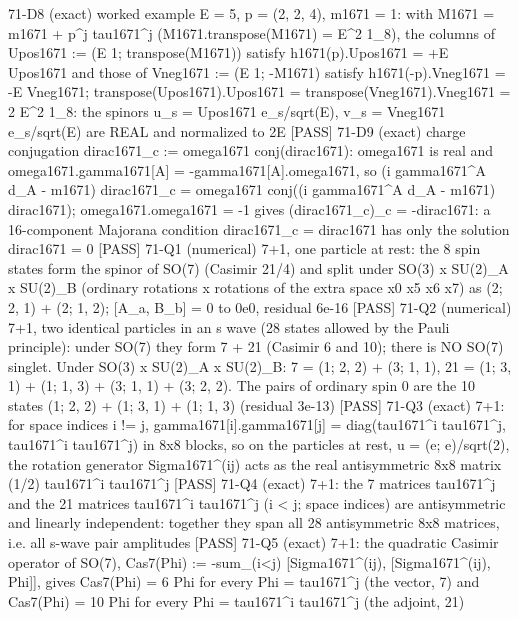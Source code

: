 \documentclass[
  10pt,
]{article}
\newenvironment{Shaded}{}{}
\newcommand{\NormalTok}[1]{#1}
\begin{document}
\begin{Shaded}
\begin{Highlighting}[]
\NormalTok{[PASS] 71{-}D8  (exact) worked example E = 5, p = (2, 2, 4), m1671 = 1: with M1671 = m1671 + p\^{}j tau1671\^{}j (M1671.transpose(M1671) = E\^{}2 1\_8), the columns of Upos1671 := (E 1; transpose(M1671)) satisfy h1671(p).Upos1671 = +E Upos1671 and those of Vneg1671 := (E 1; {-}M1671) satisfy h1671({-}p).Vneg1671 = {-}E Vneg1671; transpose(Upos1671).Upos1671 = transpose(Vneg1671).Vneg1671 = 2 E\^{}2 1\_8: the spinors u\_s = Upos1671 e\_s/sqrt(E), v\_s = Vneg1671 e\_s/sqrt(E) are REAL and normalized to 2E}
\NormalTok{[PASS] 71{-}D9  (exact) charge conjugation dirac1671\_c := omega1671 conj(dirac1671): omega1671 is real and omega1671.gamma1671[A] = {-}gamma1671[A].omega1671, so (i gamma1671\^{}A d\_A {-} m1671) dirac1671\_c = omega1671 conj((i gamma1671\^{}A d\_A {-} m1671) dirac1671); omega1671.omega1671 = {-}1 gives (dirac1671\_c)\_c = {-}dirac1671: a 16{-}component Majorana condition dirac1671\_c = dirac1671 has only the solution dirac1671 = 0}
\NormalTok{[PASS] 71{-}Q1  (numerical) 7+1, one particle at rest: the 8 spin states form the spinor of SO(7) (Casimir 21/4) and split under SO(3) x SU(2)\_A x SU(2)\_B (ordinary rotations x rotations of the extra space x0 x5 x6 x7) as (2; 2, 1) + (2; 1, 2); [A\_a, B\_b] = 0 to 0e0, residual 6e{-}16}
\NormalTok{[PASS] 71{-}Q2  (numerical) 7+1, two identical particles in an s wave (28 states allowed by the Pauli principle): under SO(7) they form 7 + 21 (Casimir 6 and 10); there is NO SO(7) singlet.  Under SO(3) x SU(2)\_A x SU(2)\_B:  7 = (1; 2, 2) + (3; 1, 1),  21 = (1; 3, 1) + (1; 1, 3) + (3; 1, 1) + (3; 2, 2).  The pairs of ordinary spin 0 are the 10 states (1; 2, 2) + (1; 3, 1) + (1; 1, 3) (residual 3e{-}13)}
\NormalTok{[PASS] 71{-}Q3  (exact) 7+1: for space indices i != j, gamma1671[i].gamma1671[j] = diag(tau1671\^{}i tau1671\^{}j, tau1671\^{}i tau1671\^{}j) in 8x8 blocks, so on the particles at rest, u = (e; e)/sqrt(2), the rotation generator Sigma1671\^{}(ij) acts as the real antisymmetric 8x8 matrix (1/2) tau1671\^{}i tau1671\^{}j}
\NormalTok{[PASS] 71{-}Q4  (exact) 7+1: the 7 matrices tau1671\^{}j and the 21 matrices tau1671\^{}i tau1671\^{}j (i \textless{} j; space indices) are antisymmetric and linearly independent: together they span all 28 antisymmetric 8x8 matrices, i.e. all s{-}wave pair amplitudes}
\NormalTok{[PASS] 71{-}Q5  (exact) 7+1: the quadratic Casimir operator of SO(7), Cas7(Phi) := {-}sum\_(i\textless{}j) [Sigma1671\^{}(ij), [Sigma1671\^{}(ij), Phi]], gives Cas7(Phi) = 6 Phi for every Phi = tau1671\^{}j (the vector, 7) and Cas7(Phi) = 10 Phi for every Phi = tau1671\^{}i tau1671\^{}j (the adjoint, 21)}

\end{Highlighting}
\end{Shaded}
\end{document}
